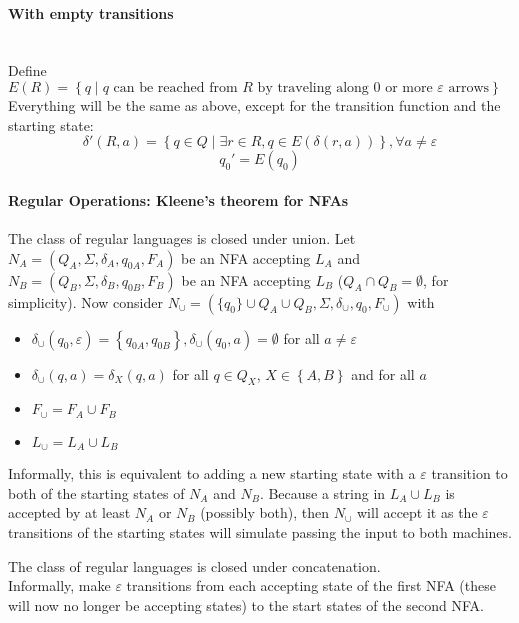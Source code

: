 \documentclass[12 pt]{article}
\begin{document}
\paragraph{With empty transitions}~ \\Define $E(R) = \left\{q \mid q
  \text{ can be reached from }R \text{ by traveling along }0 \text{ or
    more }\varepsilon \text{ arrows}\right\}$
\\
Everything will be the same as above, except for the transition
function and the starting state:
$$\delta'(R, a) = \left\{q \in Q \mid \exists r \in R, q \in
  E(\delta(r,a))\right\}, \forall a \neq \varepsilon$$
$$q_0' = E(q_0)$$
\paragraph{Regular Operations: Kleene's theorem for NFAs}
The class of regular languages is closed under union. Let $N_A = (Q_A,
\Sigma, \delta_A, q_{0A}, F_A)$ be an NFA accepting $L_A$ and $N_B =
(Q_B,\Sigma, \delta_B, q_{0B}, F_B)$ be an NFA accepting $L_B$ ($Q_A
\cap Q_B = \emptyset$, for simplicity). Now consider $N_\cup =
(\{q_0\}\cup Q_A \cup Q_B, \Sigma, \delta_\cup, q_0, F_{\cup})$ with
\begin{itemize}
\item $\delta_{\cup}(q_0, \varepsilon) = \left\{q_{0A},q_{0B}\right\},
  \delta_\cup (q_0, a) = \emptyset$ for all $a \neq \varepsilon$
\item $\delta_\cup(q, a) = \delta_X (q,a)$ for all $q\in Q_X$, $X\in
  \left\{A,B\right\}$ and for all $a$
\item $F_\cup = F_A \cup F_B$
\item $L_\cup = L_A \cup L_B$
\end{itemize}
Informally, this is equivalent to adding a new starting state with a
$\varepsilon$ transition to both of the starting states of $N_A$ and
$N_B$. Because a string in $L_A \cup L_B$ is accepted by at least
$N_A$ or $N_B$ (possibly both), then $N_\cup$ will accept it as the
$\varepsilon$ transitions of the starting states will simulate passing
the input to both machines.

The class of regular languages is closed under concatenation.  \\
Informally, make $\varepsilon$ transitions from each accepting state
of the first NFA (these will now no longer be accepting states) to the
start states of the second NFA.
\end{document}
